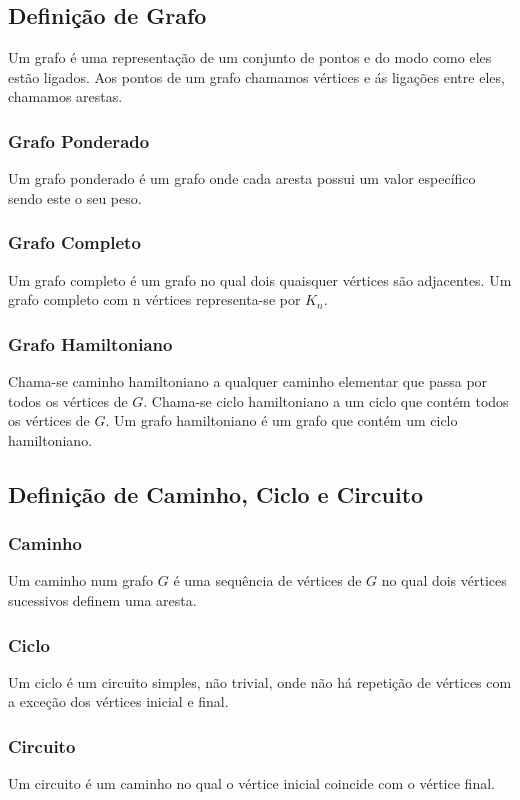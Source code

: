 \documentclass{article}
\begin{document}
\subsection{Definição de Grafo}
Um grafo é uma representação de um conjunto de pontos e do
modo como eles estão ligados. Aos pontos de um grafo chamamos vértices e ás
ligações entre eles, chamamos arestas.

\subsubsection{Grafo Ponderado}
Um grafo ponderado é um grafo onde cada aresta possui um valor específico sendo este o seu peso.

\subsubsection{Grafo Completo}
Um grafo completo é um grafo no qual dois quaisquer vértices são
adjacentes. Um grafo completo com n vértices representa-se por $K_n$.

\subsubsection{Grafo Hamiltoniano}
Chama-se caminho hamiltoniano a qualquer caminho elementar que passa por todos os vértices de $G$. Chama-se ciclo hamiltoniano a um ciclo que contém todos os vértices de $G$. Um grafo hamiltoniano é um grafo que contém um ciclo hamiltoniano.


\vspace{0.5cm}
\subsection{Definição de Caminho, Ciclo e Circuito}

\subsubsection{Caminho}
Um caminho num grafo $G$ é uma sequência de vértices de $G$ no
qual dois vértices sucessivos definem uma aresta.

\subsubsection{Ciclo}
Um ciclo é um circuito simples, não trivial, onde não há repetição de
vértices com a exceção dos vértices inicial e final.

\subsubsection{Circuito}
Um circuito é um caminho no qual o vértice inicial coincide com o vértice
final.
\end{document}
